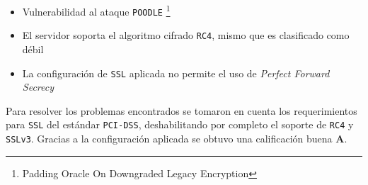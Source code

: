 \begin{itemize}
  \item Vulnerabilidad al ataque \texttt{POODLE} \footnote{Padding Oracle On Downgraded Legacy Encryption}

  \item El servidor soporta el algoritmo cifrado \texttt{RC4}, mismo que es clasificado como d\'{e}bil

  \item La configuraci\'{o}n de \texttt{SSL} aplicada no permite el uso de \textsl{Perfect Forward Secrecy}
\end{itemize}


Para resolver los problemas encontrados se tomaron en cuenta los requerimientos para \texttt{SSL} del est\'{a}ndar \texttt{PCI-DSS}, deshabilitando por completo el soporte de \texttt{RC4} y \texttt{SSLv3}. Gracias a la configuraci\'{o}n aplicada se obtuvo una calificaci\'{o}n buena \textbf{A}.


